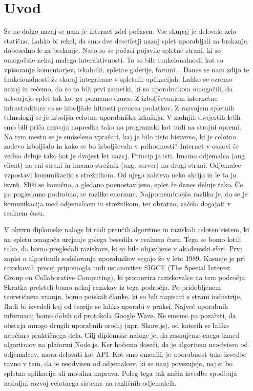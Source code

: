 \documentclass[a4paper, 12pt, twoside]{book}
\begin{document}
\chapter{Uvod}

Še ne dolgo nazaj se nam je internet zdel počasen. Vse skupaj je delovalo zelo statično. Lahko bi rekel, da smo dve desetletji nazaj splet uporabljali za brskanje, dobesedno le za brskanje. Nato so se počasi pojavile spletne strani, ki so omogočale nekaj malega interaktivnosti. To so bile funkcionalnosti kot so vpisovanje komentarjev, iskalniki, spletne galerije, forumi... Danes se nam zdijo te funkcionalnosti že skoraj integrirane v spletnih aplikacijah. Lahko se ozremo nazaj in rečemo, da so to bili prvi zametki, ki so uporabnikom omogočili, da ustvarjajo splet tak kot ga poznamo danes. Z izboljševanjem internetne infrastrukture so se izboljšale hitrosti prenosa podatkov. Z razvojem spletnih tehnologij se je izboljša celotna uporabniška izkušnja. V zadnjih dvajestih letih smo bili priča razvoju napredka tako na programski kot tudi na strojni opremi. Na tem mestu se je smiseleno vprašati, kaj je bilo tisto bistveno, ki je celotno zadevo izboljšalo in kako se bo izboljševala v prihodnosti? Internet v osnovi še vedno deluje tako kot je dvajest let nazaj. Princip je isti. Imamo odjemalca (ang. client) na eni strani in imamo strežnik (ang. server) na drugi strani. Odjemalec vzpostavi komunikacijo s strežnikom. Od njega zahteva neko akcijo in le ta jo izvrši. Sliši se komično, a gledano poenostavljeno, splet še danes deluje tako. Če pa pogledamo podrobno, se razlike enormne. Najpomembnejša razlika je, da se je komunikacija med odjemalcem in strežnikom, ter obratno, začela dogajati v realnem času.

V okviru diplomske naloge bi radi preučili algoritme in raziskali celoten sistem, ki na spletu omogoča urejanje golega besedila v realnem času. Tega se bomo lotili tako, da bomo pregledali raziskave, ki so bile objavljene v akademski sferi. Prvi zapisi o algoritmih sodelovanja uporabnikov segajo že v leto 1989. Kasneje je pri raziskavah precej pripomogla tudi ustanovitev SIGCE (The Special Interest Group on Collaborative Computing), ki promovira raziskovalce na tem področju. Skratka preleteli bomo nekaj raziskav iz tega področja. Po pridobljenem teoretičnem znanju, bomo poiskali članke, ki so bili napisani s strani industrije. Radi bi izvedeli kaj od teorije se lahko uporabi v praksi. Največ uporabnih informacij bomo dobili od protokola Google Wave. Ne smemo pa pozabiti, da obstaja mnogo drugih uporabnih orodij (npr. Share.js), od katerih se lahko naučimo praktičnega dela. Cilj diplomske naloge je, da zasnujemo enega izmed algoritmov na plaformi Node.js.  Ker hočemo doseči, da je algoritem neodvisen od odjemalcev, mora delovati kot API. Kot smo omenili, je uporabnost take izvedbe ravno v tem, da je neodvisen od odjemalcev, ki se nanj povezujejo, naj si bo spletna aplikacija ali mobilna naprava. Poleg tega tak način izvedbe spodbuja nadaljni razvoj celotnega sistema na različnih odjemalcih.
\end{document}
